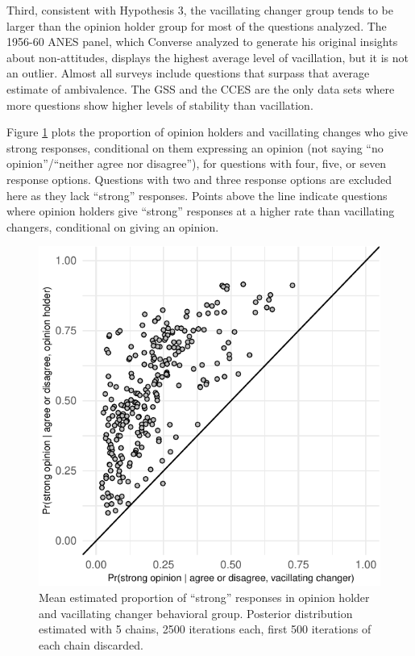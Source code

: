 \documentclass[12pt,]{article}
\begin{document}
Third, consistent with Hypothesis 3, the vacillating changer group tends to be larger than the opinion holder group for most of the questions analyzed. The 1956-60 ANES panel, which Converse analyzed to generate his original insights about non-attitudes, displays the highest average level of vacillation, but it is not an outlier. Almost all surveys include questions that surpass that average estimate of ambivalence. The GSS and the CCES are the only data sets where more questions show higher levels of stability than vacillation.

Figure \ref{fig:strongcomp} plots the proportion of opinion holders and vacillating changes who give strong responses, conditional on them expressing an opinion (not saying ``no opinion''/``neither agree nor disagree''), for questions with four, five, or seven response options. Questions with two and three response options are excluded here as they lack ``strong'' responses. Points above the line indicate questions where opinion holders give ``strong'' responses at a higher rate than vacillating changers, conditional on giving an opinion.

\begin{figure}
\centering
\includegraphics{ambivalence_everywhere_files/figure-latex/strongcomp-1.pdf}
\caption{\label{fig:strongcomp}Mean estimated proportion of ``strong'' responses in opinion holder and vacillating changer behavioral group. Posterior distribution estimated with 5 chains, 2500 iterations each, first 500 iterations of each chain discarded.}
\end{figure}
\end{document}

